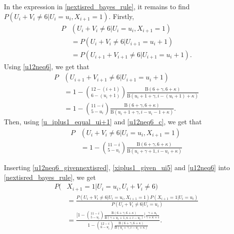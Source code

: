 In the expression in \eqref{nextisred_bayes_rule}, it remains to find $P(U_i+V_i\neq6|U_i=u_i,X_{i+1}=1)$.
Firstly, 
\begin{equation}
\label{u_iplus1_equal_ui+1}
    \begin{aligned}
        P&(U_i+V_i\neq6|U_i=u_i,X_{i+1}=1) \\[6pt]
        &= P(U_i+V_i\neq6|U_{i+1}=u_i+1)
        \\[6pt]
        &= P(U_{i+1}+V_{i+1}\neq6|U_{i+1}=u_i+1).
    \end{aligned}
\end{equation}
Using \eqref{u12neq6}, we get that
\begin{equation}
\label{u12neq6_c}
    \begin{aligned}
        P&(U_{i+1}+V_{i+1}\neq6|U_{i+1}=u_i+1) \\[6pt]
        &= 1-\binom{12-(i+1)}{6-(u_i+1)} \frac{\text{B}(6+\gamma,6+\kappa)}{\text{B}(u_i+1+\gamma,i-(u_i+1)+\kappa)}\\[6pt]
        &= 1-\binom{11-i}{5-u_i} \frac{\text{B}(6+\gamma,6+\kappa)}{\text{B}(u_i+1+\gamma,i-u_i-1+\kappa)}.
    \end{aligned}
\end{equation}
Then, using \eqref{u_iplus1_equal_ui+1} and \eqref{u12neq6_c}, we get that 
\begin{equation}
\label{u12neq6_givennextisred}
    \begin{aligned}
        P&(U_i+V_i\neq6|U_i=u_i,X_{i+1}=1)\\[6pt] 
        &= 1-\binom{11-i}{5-u_i} \frac{\text{B}(6+\gamma,6+\kappa)}{\text{B}(u_i+\gamma+1,i-u_i+\kappa)}
    \end{aligned}
\end{equation}

Inserting \eqref{u12neq6_givennextisred}, \eqref{xiplus1_given_ui5} and \eqref{u12neq6} into \eqref{nextisred_bayes_rule}, we get
\begin{equation}
\label{nextisred_given_majority}
    \begin{aligned}
        P(&X_{i+1}=1|U_i=u_i,U_i+V_i\neq6) \\[6pt]
        &= \frac{P(U_i+V_i\neq6|U_i=u_i,X_{i+1}=1)P(X_{i+1}=1|U_i=u_i)}
        {P(U_i+V_i\neq6|U_i=u_i)}\\[6pt]
        &= \frac{\bigg[ 1 - \binom{11-i}{5-u_i}\frac{\text{B}(6+\gamma,6+\kappa)}{\text{B}(\gamma+u_i+1,\kappa+i-u_i)} \bigg]
        \frac{\gamma+u_i}
        {\gamma+\kappa+i}}
        {1-\binom{12-i}{6-u_i} \frac{\text{B}(6+\gamma,6+\kappa)}{\text{B}(u_i+\gamma,i-u_i+\kappa)}}.
    \end{aligned}
\end{equation}


